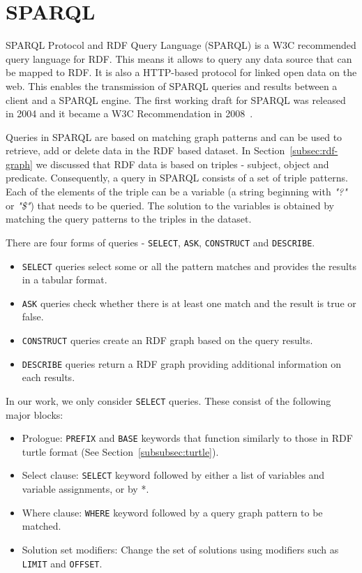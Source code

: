 \section{SPARQL}
SPARQL Protocol and RDF Query Language (SPARQL) is a W3C recommended query language for RDF. This means it allows to query any data source that can be mapped to RDF. It is also a HTTP-based protocol for linked open data on the web. This enables the transmission of SPARQL queries and results between a client and a SPARQL engine. The first working draft for SPARQL was released in 2004 and it became a W3C Recommendation in 2008~\cite{Perez2009}. 

Queries in SPARQL are based on matching graph patterns and can be used to retrieve, add or delete data in the RDF based dataset. In Section~\ref{subsec:rdf-graph} we discussed that RDF data is based on triples - subject, object and predicate. Consequently, a query in SPARQL consists of a set of triple patterns. Each of the elements of the triple can be a variable (a string beginning with \textit{"?"} or \textit{"\$"}) that needs to be queried. The solution to the variables is obtained by matching the query patterns to the triples in the dataset.

There are four forms of queries - \texttt{SELECT}, \texttt{ASK}, \texttt{CONSTRUCT} and \texttt{DESCRIBE}. 
\begin{itemize}
\item \texttt{SELECT} queries select some or all the pattern matches and provides the results in a tabular format.
\item \texttt{ASK} queries check whether there is at least one match and the result is true or false.
\item \texttt{CONSTRUCT} queries create an RDF graph based on the query results.
\item \texttt{DESCRIBE} queries return a RDF graph providing additional information on each results.
\end{itemize}

In our work, we only consider \texttt{SELECT} queries. These consist of the following major blocks:
\begin{itemize}
\item Prologue: \texttt{PREFIX} and \texttt{BASE} keywords that function similarly to those in RDF turtle format (See Section~\ref{subsubsec:turtle}).
\item Select clause: \texttt{SELECT} keyword followed by either a list of variables and variable assignments, or by *.
\item Where clause: \texttt{WHERE} keyword followed by a query graph pattern to be matched.
\item Solution set modifiers: Change the set of solutions using modifiers such as \texttt{LIMIT} and \texttt{OFFSET}.
\end{itemize}

